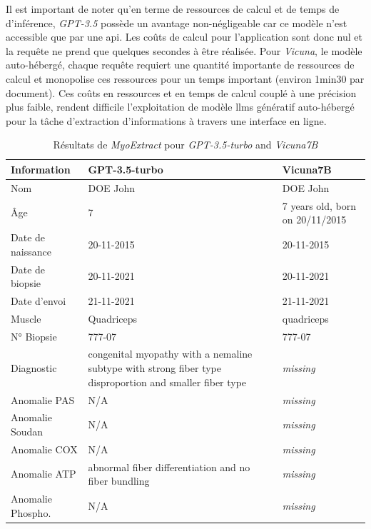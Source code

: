 Il est important de noter qu'en terme de ressources de calcul et de temps de d'inférence, \textit{GPT-3.5} possède un avantage non-négligeable car ce modèle n'est accessible que par une \gls{api}. Les coûts de calcul pour l'application sont donc nul et la requête ne prend que quelques secondes à être réalisée. Pour \textit{Vicuna}, le modèle auto-hébergé, chaque requête requiert une quantité importante de ressources de calcul et monopolise ces ressources pour un temps important (environ 1min30 par document). Ces coûts en ressources et en temps de calcul couplé à une précision plus faible, rendent difficile l'exploitation de modèle \gls{llms} génératif auto-hébergé pour la tâche d'extraction d'informations à travers une interface en ligne.
\begin{table}[ht]
\centering
\caption{Résultats de \textit{MyoExtract} pour \textit{GPT-3.5-turbo} and \textit{Vicuna7B}}
\label{tab:json_data}
\begin{tabularx}{\textwidth}{|X|X|X|}
\hline
\textbf{Information} & \textbf{GPT-3.5-turbo} & \textbf{Vicuna7B} \\ \hline
Nom & DOE John & DOE John \\ \hline
Âge & 7 & 7 years old, born on 20/11/2015 \\ \hline
Date de naissance & 20-11-2015 & 20-11-2015 \\ \hline
Date de biopsie & 20-11-2021 & 20-11-2021 \\ \hline
Date d'envoi & 21-11-2021 & 21-11-2021 \\ \hline
Muscle & Quadriceps & quadriceps \\ \hline
N° Biopsie & 777-07 & 777-07 \\ \hline
Diagnostic & congenital myopathy with a nemaline subtype with strong fiber type disproportion and smaller fiber type & \textit{missing} \\ \hline
Anomalie PAS & N/A & \textit{missing} \\ \hline
Anomalie Soudan & N/A & \textit{missing} \\ \hline
Anomalie COX & N/A & \textit{missing} \\ \hline
Anomalie ATP & abnormal fiber differentiation and no fiber bundling & \textit{missing} \\ \hline
Anomalie Phospho. & N/A & \textit{missing} \\ \hline
\end{tabularx}
\end{table}

